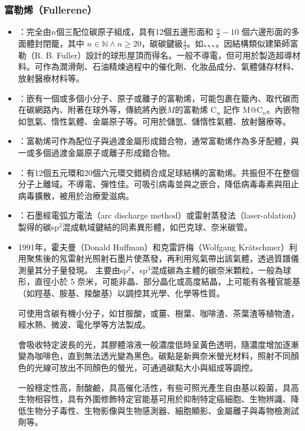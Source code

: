 \documentclass[a4paper,12pt]{report}
\begin{document}
\begin{itemize}
\begin{itemize}
\subsubsection{富勒烯（Fullerene）}
\begin{itemize}
\item {}：完全由$n$個三配位碳原子組成，具有12個五邊形面和 $\frac{n}{2}-10$ 個六邊形面的多面體封閉籠，其中 $n\in\mathbb{N}\land n\geq 20$，碳碳鍵級$\frac{4}{3}$。如、、、。因結構類似建築師富勒（R. B. Fuller）設計的球形屋頂而得名。一般不導電，但可用於製造超導材料。可作為潤滑劑、石油精煉過程中的催化劑、化妝品成分、氣體儲存材料、放射醫療材料等。
\item {}：嵌有一個或多個小分子、原子或離子的富勒烯，可能包裹在籠內、取代碳而在碳網路內、附著在球外等，傳統將內嵌$M$的富勒烯 C$_n$ 記作 M@C$_n$。內嵌物如氫氣、惰性氣體、金屬原子等。可用於儲氫、儲惰性氣體、放射醫療等。
\item {}：富勒烯可作為配位子與過渡金屬形成錯合物，通常富勒烯作為多牙配體，與一或多個過渡金屬原子或離子形成錯合物。
\item {}：有12個五元環和20個六元環交錯稠合成足球結構的富勒烯。共振但不在整個分子上離域。不導電、彈性佳。可吸引病毒並與之嵌合，降低病毒毒素與阻止病毒擴散，被用於治療愛滋病。
\item {}：石墨經電弧方電法（arc discharge method）或雷射蒸發法（laser-ablation）製得的碳sp$^2$混成軌域鍵結的同素異形體，如巴克球、奈米碳管。
\item 1991年，霍夫曼（Donald Huffman）和克雷許梅（Wolfgang Krätschmer）利用聚焦後的氖雷射光照射石墨片使蒸發，再利用氖氣帶出該氣體，透過質譜儀測量其分子量發現。
\eit
{}
主要由sp$^2$、sp$^3$混成碳為主體的碳奈米顆粒，一般為球形，直徑小於 5 奈米，可能非晶、部分晶化或高度結晶，上可能有各種官能基（如羥基、胺基、羧酸基）以調控其光學、化學等性質。

可使用含碳有機小分子，如甘胺酸，或薑、樹葉、咖啡渣、茶葉渣等植物渣，經水熱、微波、電化學等方法製成。

會吸收特定波長的光，其膠體溶液一般濃度低時呈黃色透明，隨濃度增加逐漸變為咖啡色，直到無法透光變為黑色。碳點是新興奈米螢光材料，照射不同顏色的光線可放出不同顏色的螢光，可通過碳點大小與組成等調控。

一般穩定性高，耐酸鹼，具高催化活性，有些可照光產生自由基以殺菌，具高生物相容性，具有外圍修飾特定官能基可用於抑制特定癌細胞、生物辨識、降低生物分子毒性、生物影像與生物感測器、細胞顯影、金屬離子與毒物檢測試劑等。


\end{itemize}
\end{itemize}
\end{itemize}
\end{document}
